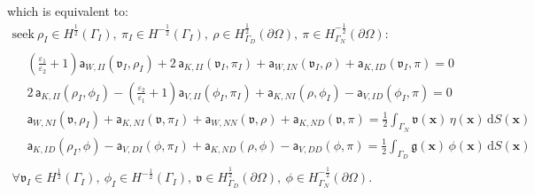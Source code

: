 \documentclass{article}
\theoremstyle{remark}
\newcommand{\aaa}{\mathsf{a}}
\newcommand{\x}{\boldsymbol{x}}
\newcommand{\dd}{\mathrm{d}}
\newcommand{\argv}{\mathfrak{v}}
\newcommand{\argg}{\mathfrak{g}}
\begin{document}
which is equivalent to:
\begin{equation}
\label{eq:adjoint}
\begin{gathered}
    \text{seek}~\rho_I\in H^{\frac{1}{2}}(\Gamma_I),
    ~\pi_I\in H^{-\frac{1}{2}}(\Gamma_I),
    ~\rho\in H^{\frac{1}{2}}_{\Gamma_D}(\partial\Omega),
    ~\pi\in H^{-\frac{1}{2}}_{\Gamma_N}(\partial\Omega):\\
    \begin{aligned}
    &\left(\frac{\varepsilon_1}{\varepsilon_2}+1\right)\aaa_{W,II}(\argv_I,\rho_I)+2\,\aaa_{K,II}(\argv_I,\pi_I)+\aaa_{W,IN}(\argv_I,\rho)+\aaa_{K,ID}(\argv_I,\pi)
    =0\\
    &2\,\aaa_{K,II}(\rho_I,\phi_I)-\left(\frac{\varepsilon_2}{\varepsilon_1}+1\right)\aaa_{V,II}(\phi_I,\pi_I)+\aaa_{K,NI}(\rho,\phi_I)-\aaa_{V,ID}(\phi_I,\pi)
    =0\\
    &\aaa_{W,NI}(\argv,\rho_I)+\aaa_{K,NI}(\argv,\pi_I)+\aaa_{W,NN}(\argv,\rho)+\aaa_{K,ND}(\argv,\pi)
    =\frac{1}{2}\int_{\Gamma_N}\argv(\x)\,\eta(\x)\,\dd S(\x)\\
    &\aaa_{K,ID}(\rho_I,\phi)-\aaa_{V,DI}(\phi,\pi_I)+\aaa_{K,ND}(\rho,\phi)-\aaa_{V,DD}(\phi,\pi)
    =\frac{1}{2}\int_{\Gamma_D}\argg(\x)\,\phi(\x)\,\dd S(\x)
    \end{aligned}\\
    \forall\argv_I\in H^{\frac{1}{2}}(\Gamma_I),~\phi_I\in H^{-\frac{1}{2}}(\Gamma_I),~\argv\in H^{\frac{1}{2}}_{\Gamma_D}(\partial\Omega),~\phi\in H^{-\frac{1}{2}}_{\Gamma_N}(\partial\Omega).
\end{gathered}
\end{equation}
\end{document}
